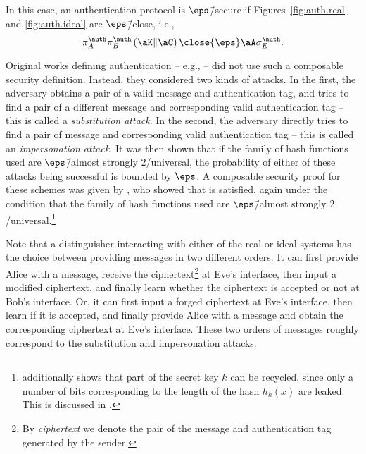 In this case, an authentication protocol is $\eps$\=/secure if Figures~\ref{fig:auth.real} and \ref{fig:auth.ideal} are $\eps$\=/close, i.e.,
\begin{equation} \label{eq:security.auth} \pi^{\auth}_A\pi^{\auth}_B
  \left(\aK \| \aC \right) \close{\eps} \aA\sigma^{\auth}_E.
\end{equation}

Original works defining authentication \--- e.g.,
\textcite{WC81,Sim85,Sim88,Sti90,Sti94} \--- did not use such a
composable security definition. Instead, they considered two kinds of
attacks. In the first, the adversary obtains a pair of a valid message
and authentication tag, and tries to find a pair of a different
message and corresponding valid authentication tag \--- this is called
a \emph{substitution attack}. In the second, the adversary directly
tries to find a pair of message and corresponding valid authentication
tag \--- this is called an \emph{impersonation attack}. It was then
shown that if the family of hash functions used are $\eps$\=/almost
strongly $2$\-/universal,  the probability
of either of these attacks being successful is bounded by $\eps$. A
composable security proof for these schemes was given by
\textcite{Por14}, who showed that  is
satisfied, again under the condition that the family of hash functions
used are $\eps$\=/almost strongly
$2$\-/universal.\footnote{\textcite{Por14} additionally shows that
  part of the secret key $k$ can be recycled, since only a number of
  bits corresponding to the length of the hash $h_k(x)$ are
  leaked. This is discussed in .}

Note that a distinguisher interacting with either of the real or ideal
systems has the choice between providing messages in two different
orders. It can first provide Alice with a message, receive the
ciphertext\footnote{By \emph{ciphertext} we denote the pair of the
  message and authentication tag generated by the sender.} at Eve's
interface, then input a modified ciphertext, and finally learn whether
the ciphertext is accepted or not at Bob's interface. Or, it can first
input a forged ciphertext at Eve's interface, then learn if it is
accepted, and finally provide Alice with a message and obtain the
corresponding ciphertext at Eve's interface. These two orders of
messages roughly correspond to the substitution and impersonation
attacks.

